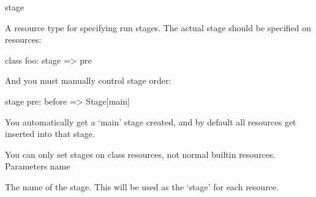stage

A resource type for specifying run stages. The actual stage should be specified on resources:

class { foo: stage => pre }

And you must manually control stage order:

stage { pre: before => Stage[main] }

You automatically get a ‘main’ stage created, and by default all resources get inserted into that stage.

You can only set stages on class resources, not normal builtin resources.
Parameters
name

The name of the stage. This will be used as the ‘stage’ for each resource.
